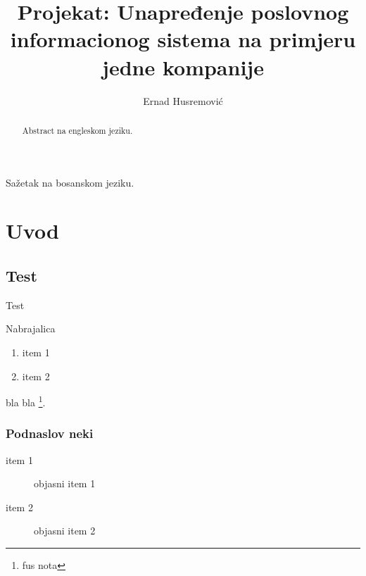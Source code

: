 \documentclass[times, utf8, seminar]{fit}
\begin{document}
\title{Projekat: Unapređenje poslovnog informacionog sistema na primjeru jedne kompanije}

\author{Ernad Husremović}


\maketitle

\tableofcontents

\begin{sazetak}

Sažetak na bosanskom jeziku.

\end{sazetak}

\begin{abstract}
Abstract na engleskom jeziku.

\end{abstract}




\chapter{Uvod}

\section{Test}

Test

Nabrajalica

\begin{enumerate}
  \item item 1
  \item item 2
\end{enumerate}

bla bla \footnote{fus nota}.

\subsection{Podnaslov neki}

\label{labela_oznaka}

\begin{description}
  \item [item 1]  objasni item 1
  \item [item 2] objasni item 2
\end{description}
 
\end{document}
